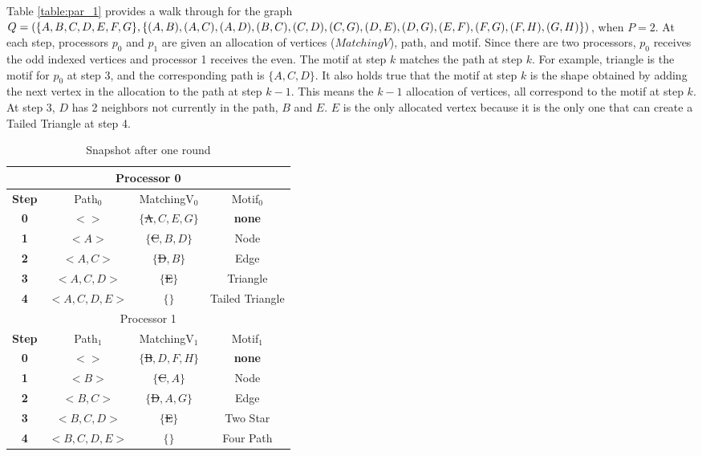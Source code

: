 \documentclass[12pt,twoside]{reedthesis}
\begin{document}
Table \ref{table:par_1} provides a walk through for the graph $Q = (\{A,B,C,D,E,F,G \}, \\ \{ (A,B), (A,C), (A,D), (B,C), (C,D), (C,G), (D,E), (D,G), (E,F), (F,G), (F,H), (G,H)\})$, when $P = 2$. At each step, processors $p_{0}$ and $p_{1}$ are given an allocation of vertices ($MatchingV$), path, and motif. Since there are two processors, $p_0$ receives the odd indexed vertices and processor 1 receives the even. The motif at step $k$ matches the path at step $k$. For example, triangle is the motif for $p_{0}$ at step 3, and the corresponding path is $\{A,C,D\}$. It also holds true that the motif at step $k$ is the shape obtained by adding the next vertex in the allocation to the path at step $k-1$. This means the $k-1$ allocation of vertices, all correspond to the motif at step $k$. At step 3, $D$ has 2 neighbors not currently in the path, $B$ and $E$. $E$ is the only allocated vertex because it is the only one that can create a Tailed Triangle at step 4.

\begin{table}[h!]
\begin{tabular}{ |c| c c c |  }
	 \hline
 	\multicolumn{4}{|c|}{Processor 0} \\
 	\hline
	 \textbf{Step} & Path$_{0}$ & MatchingV$_{0}$ & Motif$_{0}$ \\
 	\hline
	\textbf{0} & $<  >$ & $\{$\sout{A}$,C,E, G\}$ & \textbf{none} \\
	\textbf{1} & $<A>$ & $\{$\sout{C}$,B,D\}$ & Node \\
	\textbf{2} & $<A,C>$ & $\{$\sout{D}$,B\}$ & Edge \\
	\textbf{3} & $<A,C,D>$ & $\{$\sout{E}$\}$ & Triangle \\
	\textbf{4}& $<A,C,D,E>$ & $\{\}$ & Tailed Triangle \\
	 \hline
	 \hline
 	\multicolumn{4}{|c|}{Processor 1}\\
 	\hline
	 \textbf{Step} & Path$_{1}$ & MatchingV$_{1}$ & Motif$_{1}$ \\
 	\hline
	\textbf{0}& $<  >$ & $\{$\sout{B}$, D, F, H\}$ & \textbf{none} \\
	\textbf{1}& $<B>$ & $\{$\sout{C}$,A \}$ & Node \\
	\textbf{2}& $<B,C>$ & $\{$\sout{D}$,A,G\}$ & Edge \\
	\textbf{3} & $<B,C,D>$ & $\{$\sout{E}$\}$ & Two Star \\
	\textbf{4} & $<B,C,D,E>$ & $\{\}$ & Four Path \\
	 \hline
\end{tabular}
 \caption{Snapshot  after one round}
\label{table:par_cur}
\end{table}
\end{document}
